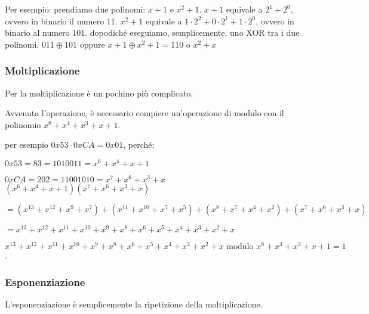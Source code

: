 \textsf{\small Per esempio: prendiamo due polinomi: $x + 1 \text{ e } x^2 + 1$.}
\textsf{\small $x + 1$ equivale a $2^1 + 2^0$, ovvero in binario il numero 11.}
\textsf{\small $x^2 + 1$ equivale a $1 \cdot 2^2 + 0 \cdot 2^1 + 1 \cdot 2^0$, ovvero in binario al numero 101.}
\textsf{\small dopodiché eseguiamo, semplicemente, uno XOR tra i due polinomi.}
\textsf{\small  $011 \oplus 101$ oppure $x + 1 \oplus x^2 + 1 = 110 \text{ o } x^2 + x$}

\subsubsection{Moltiplicazione}


\textsf{\small Per la moltiplicazione è un pochino più complicato.} %

\textsf{\small Avvenuta l'operazione, è necessario compiere un'operazione di modulo con il polinomio $x^8 + x^4 + x^3 + x + 1$. } %

\textsf{\small per esempio $0x53 \cdot 0xCA = 0x01$, perché: } %

\textsf{\small $0x53 = 83 = 1010011 = x^6 + x^4 + x + 1$}

\textsf{\small $ 0xCA = 202 = 11001010 = x^7 + x^6 + x^3 + x $} \\

\textsf{\small $ (x^6 + x^4 + x + 1)(x^7 + x^6 + x^3 + x) $}

\textsf{\small $ = (x^{13} + x^{12} + x^9 + x^7)  + (x^{11} + x^{10} + x^7 + x^5) + (x^8 + x^7 + x^4 + x^2) + (x^7 + x^6 + x^3 + x)$}

\textsf{\small $ = x^{13} + x^{12} + x^{11} + x^{10} + x^9 + x^8 + x^6 + x^5 + x^4 + x^3 + x^2 + x$}

\textsf{\small $ x^{13} + x^{12} + x^{11} + x^{10} + x^9 + x^8 + x^6 + x^5 + x^4 + x^3 + x^2 + x \text{ modulo } x^8 + x^4 + x^3 + x + 1 = 1$.}

\subsubsection{Esponenziazione} %

 

\textsf{\small L'esponenziazione è semplicemente la ripetizione della moltiplicazione.}

